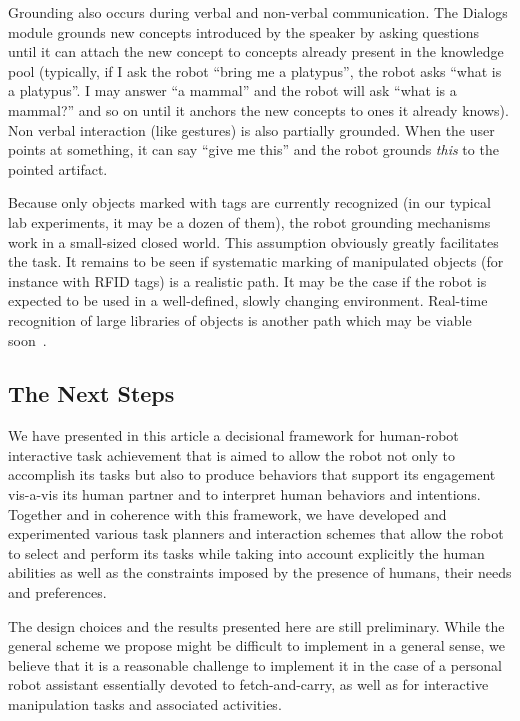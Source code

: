 \documentclass[preprint,3p,times]{elsarticle}
\begin{document}
Grounding also occurs during verbal and non-verbal communication. The {\sc
Dialogs} module grounds new concepts introduced by the speaker by asking questions
until it can attach the new concept to concepts already present in the
knowledge pool (typically, if I ask the robot ``bring me a platypus'', the
robot asks ``what is a platypus''. I may answer ``a mammal'' and the robot will
ask ``what is a mammal?'' and so on until it anchors the new concepts to ones
it already knows). Non verbal interaction (like gestures) is also partially
grounded. When the user points at something, it can say ``give me this'' and
the robot grounds \emph{this} to the pointed artifact.

Because only objects marked with tags are currently recognized (in our typical
lab experiments, it may be a dozen of them), the robot grounding mechanisms work
in a small-sized closed world. This assumption obviously greatly facilitates
the task. It remains to be seen if systematic marking of manipulated objects
(for instance with RFID tags) is a realistic path. It may be the case if the
robot is expected to be used in a well-defined, slowly changing environment.
Real-time recognition of large libraries of objects is another path which may
be viable soon~\cite{Dean2013Fast}.


\subsection{The Next Steps}

We have presented in this article a decisional framework for human-robot
interactive task achievement that is aimed to allow the robot not only to
accomplish its tasks but also to produce behaviors that support its engagement
vis-a-vis its human partner and to interpret human behaviors and intentions.
Together and in coherence with this framework, we have developed and
experimented various task planners and interaction schemes that allow the robot
to select and perform its tasks while taking into account explicitly the human
abilities as well as the constraints imposed by the presence of humans, their
needs and preferences. 

The design choices and the results presented here are still preliminary.
While the general scheme we propose might be difficult to implement in
a general sense, we believe that it is a reasonable challenge to
implement it in the case of a personal robot assistant essentially
devoted to fetch-and-carry, as well as for interactive manipulation
tasks and associated activities.
\end{document}
